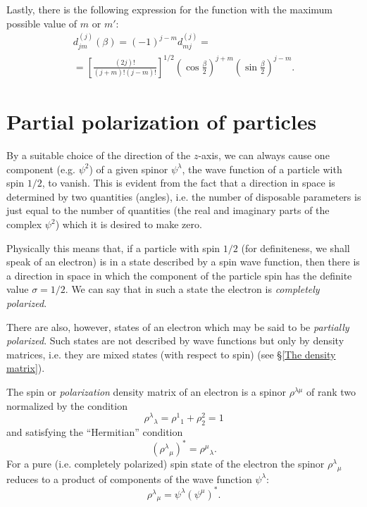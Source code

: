 Lastly, there is the following expression for the function with the maximum possible value of $ m $ or $ m' $:
\begin{multline}\label{58.26}
d_{jm}^{(j)}(\beta)=(-1)^{j-m}d_{mj}^{(j)}=\\
=\left[\frac{(2j)!}{(j+m)!(j-m)!} \right]^{1/2}\left(\cos\frac{\beta}{2} \right)^{j+m}\left(\sin\frac{\beta}{2} \right)^{j-m}.
\end{multline}

\section{Partial polarization of particles}\label{Partial polarization of particles}
By a suitable choice of the direction of the $ z $-axis, we can always cause one component (e.g. $\psi^2$) of a given spinor $\psi^\lambda$, the wave function of a particle with spin $ 1/2 $, to vanish. This is evident from the fact that a direction in space is determined by two quantities (angles), i.e. the number of disposable parameters is just equal to the number of quantities (the real and imaginary parts of the complex $\psi^2$) which it is desired to make zero.

Physically this means that, if a particle with spin $ 1/2 $ (for definiteness, we shall speak of an electron) is in a state described by a spin wave function, then there is a direction in space in which the component of the particle spin has the definite value $ \sigma=1/2 $. We can say that in such a state the electron is \textit{completely polarized}.

There are also, however, states of an electron which may be said to be \textit{partially polarized}. Such states are not described by wave functions but only by density matrices, i.e. they are mixed states (with respect to spin) (see \S\ref{The density matrix}).

The spin or \textit{polarization} density matrix of an electron is a spinor $ \rho^{\lambda\mu} $ of rank two normalized by the condition
\begin{equation}\label{59.1}
\rho^\lambda{}_\lambda=\rho^1{}_1+\rho^2_2=1
\end{equation}
and satisfying the “Hermitian” condition
\begin{equation}\label{59.2}
(\rho^\lambda{}_\mu)^*=\rho^\mu{}_\lambda.
\end{equation}
For a pure (i.e. completely polarized) spin state of the electron the spinor $ \rho^\lambda{}_\mu $ reduces to a product of components of the wave function $\psi^\lambda$:
\begin{equation}\label{59.3}
\rho^\lambda{}_\mu=\psi^\lambda(\psi^\mu)^*.
\end{equation}


